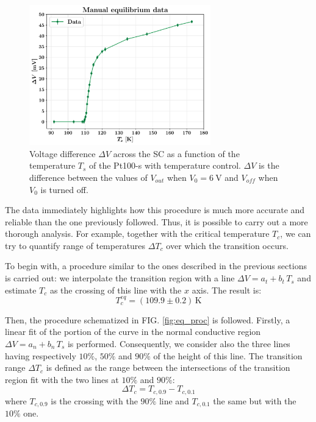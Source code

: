 \documentclass[rmp,10pt,onecolumn,fleqn,notitlepage]{revtex4-1}
\begin{document}
\begin{figure}[h!]
    \centering
    \includegraphics[width=0.7\textwidth]{image/equilibrium_plots/equilibrium_data.pdf}
    \caption{Voltage difference $\Delta V$ across the SC as a function of the temperature $T_s$ of the Pt100-s with temperature control. $\Delta V$ is the difference between the values of $V_{out}$ when $V_0 = \SI{6}{\volt}$ and $V_{off}$ when $V_0$ is turned off.}
    \label{fig:equilibrium_data}
\end{figure}

\pagebreak

The data immediately highlights how this procedure is much more accurate and reliable than the one previously followed. Thus, it is possible to carry out a more thorough analysis. For example, together with the critical temperature $T_c$, we can try to quantify range of temperatures $\Delta T_c$ over which the transition occurs. 

To begin with, a procedure similar to the ones described in the previous sections is carried out: we interpolate the transition region with a line $\Delta V = a_t + b_t \, T_s$ and estimate $T_c$ as the crossing of this line with the $x$ axis. The result is:
\begin{equation*}
    T_c^{eq} = (109.9 \pm 0.2) \, \si{\kelvin}
\end{equation*}

Then, the procedure schematized in FIG. \ref{fig:eq_proc} is followed. Firstly, a linear fit of the portion of the curve in the normal conductive region $\Delta V = a_n + b_n \, T_s$  is performed. Consequently, we consider also the three lines having respectively $10\%$, $50\%$ and $90\%$ of the height of this line. The transition range $\Delta T_c$ is defined as the range between the intersections of the transition region fit with the two lines at $10\%$ and $90\%$:
\begin{equation*}
    \Delta T_c = T_{c,0.9} - T_{c,0.1} 
\end{equation*}
where $T_{c,0.9}$ is the crossing with the $90\%$ line and $T_{c,0.1}$ the same but with the $10\%$ one.
\end{document}
